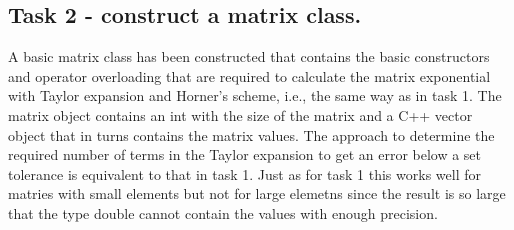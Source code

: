 \documentclass[paper=a4, fontsize=11pt]{article} %
\begin{document}
\subsection{Task 2 - construct a matrix class.}

A basic matrix class has been constructed that contains the basic constructors and operator overloading that are required to calculate the matrix exponential with Taylor expansion and Horner's scheme, i.e., the same way as in task 1. The matrix object contains an int with the size of the matrix and a C++ vector object that in turns contains the matrix values. The approach to determine the required number of terms in the Taylor expansion to get an error below a set tolerance is equivalent to that in task 1. Just as for task 1 this works well for matries with small elements but not for large elemetns since the result is so large that the type double cannot contain the values with enough precision.
\end{document}
